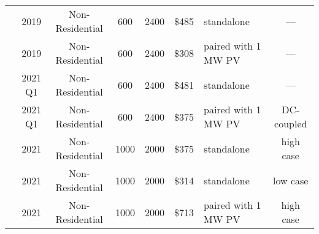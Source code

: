 \begin{tabular}{rccccclc}
\citet{augustineblair2021}  & 2019                                                                         & Non-Residential                                                               & 600                       & 2400                     & \$485               & standalone                                                                                          &               ---         \\
\citet{augustineblair2021}  & 2019                                                                         & Non-Residential                                                               & 600                       & 2400                    & \$308                & paired with 1 MW PV                                                                                          &        ---                \\
\citet{ramasamy2021}   & 2021 Q1                                                                         & Non-Residential                                                                 & 600                      & 2400                     & \$481                   & standalone                                                                                          &          ---              \\
\citet{ramasamy2021}   & 2021 Q1                                                                         & Non-Residential                                                                 & 600                      & 2400                     & \$375                   & paired with 1 MW PV                                                                                 &        DC-coupled               \\
\citet{LazardLCOSv7}               & 2021                                                                            & Non-Residential                                                            & 1000 & 2000 & \$375                   & standalone                                                                                          & high case              \\
\citet{LazardLCOSv7}                & 2021                                                                            & Non-Residential                                                              & 1000 & 2000 & \$314                   & standalone                                                                                          & low case               \\
\citet{LazardLCOSv7}                & 2021                                                                            & Non-Residential                                                             & 1000 & 2000 & \$713                   & paired with 1 MW PV                                                                                 & high case              \\

\end{tabular}
